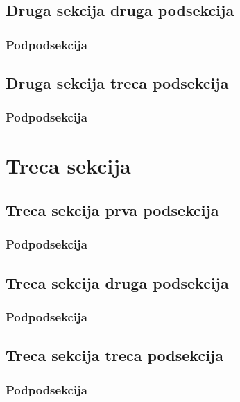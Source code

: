 \documentclass{viser-thesis}
\begin{document}
\subsection{Druga sekcija druga podsekcija}
\newpage
\subsubsection{Podpodsekcija}
\newpage
\subsection{Druga sekcija treca podsekcija}
\newpage
\subsubsection{Podpodsekcija}
\newpage

\section{Treca sekcija}
\newpage
\subsection{Treca sekcija prva podsekcija}
\newpage
\subsubsection{Podpodsekcija}
\newpage
\subsection{Treca sekcija druga podsekcija}
\newpage
\subsubsection{Podpodsekcija}
\newpage
\subsection{Treca sekcija treca podsekcija}
\newpage
\subsubsection{Podpodsekcija}
\newpage

\printindex
\newpage

\printbibliography[heading=bibintoc]
\end{document}
